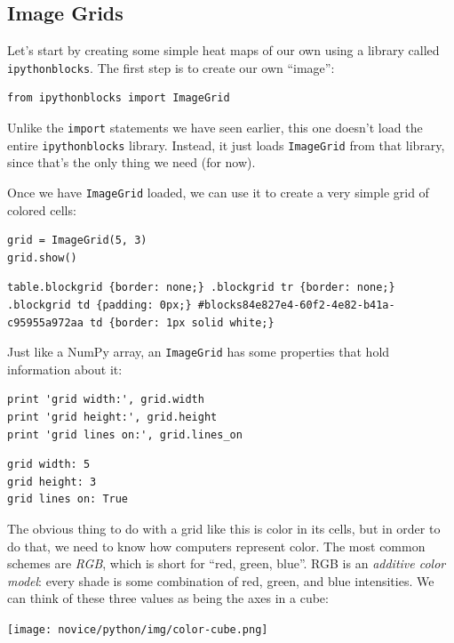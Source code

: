\documentclass[]{book}
\newcommand{\gdef}[2]{\emph{#2}}
\begin{document}
\subsection{Image Grids}

Let's start by creating some simple heat maps of our own using a library
called \texttt{ipythonblocks}. The first step is to create our own
``image'':

\begin{verbatim}
from ipythonblocks import ImageGrid
\end{verbatim}

Unlike the \texttt{import} statements we have seen earlier, this one
doesn't load the entire \texttt{ipythonblocks} library. Instead, it just
loads \texttt{ImageGrid} from that library, since that's the only thing
we need (for now).

Once we have \texttt{ImageGrid} loaded, we can use it to create a very
simple grid of colored cells:

\begin{verbatim}
grid = ImageGrid(5, 3)
grid.show()
\end{verbatim}

\begin{verbatim}
table.blockgrid {border: none;} .blockgrid tr {border: none;} .blockgrid td {padding: 0px;} #blocks84e827e4-60f2-4e82-b41a-c95955a972aa td {border: 1px solid white;}
\end{verbatim}

Just like a NumPy array, an \texttt{ImageGrid} has some properties that
hold information about it:

\begin{verbatim}
print 'grid width:', grid.width
print 'grid height:', grid.height
print 'grid lines on:', grid.lines_on
\end{verbatim}

\begin{verbatim}
grid width: 5
grid height: 3
grid lines on: True
\end{verbatim}

The obvious thing to do with a grid like this is color in its cells, but
in order to do that, we need to know how computers represent color. The
most common schemes are \gdef{g:rgb}{RGB}, which is short for ``red,
green, blue''. RGB is an \gdef{g:additive-color-model}{additive
color model}: every shade is some combination of red, green, and blue
intensities. We can think of these three values as being the axes in a
cube:

\texttt{[image: novice/python/img/color-cube.png]}
\end{document}
